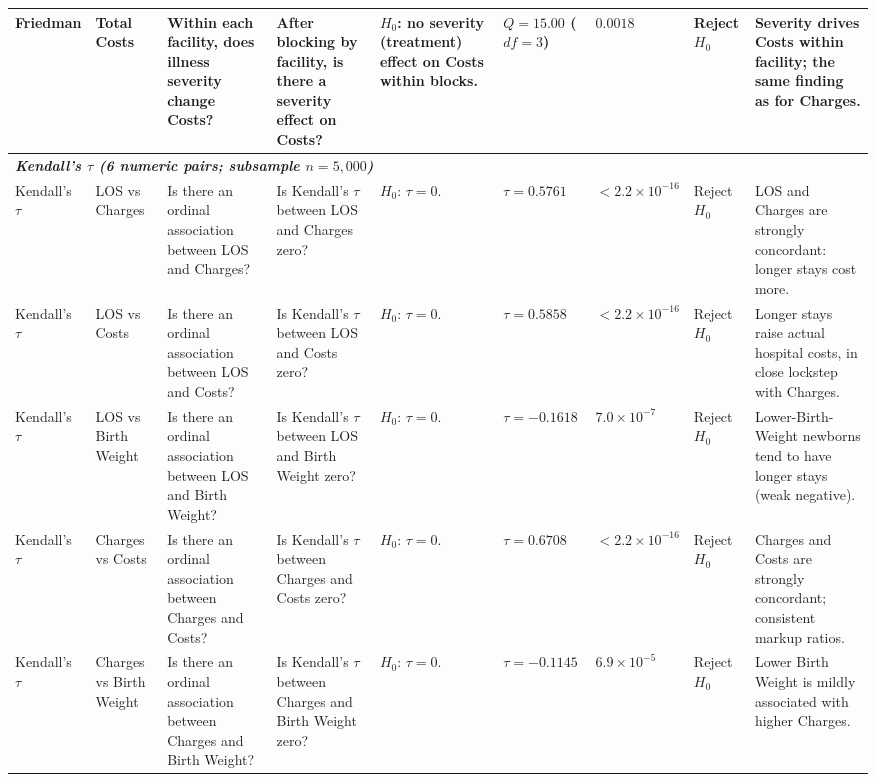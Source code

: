 \documentclass[12pt]{article}
\begin{document}
\begin{landscape}
\begin{scriptsize}
\begin{longtable}{p{2.0cm} p{2.4cm} p{3.0cm} p{2.7cm} p{2.5cm} p{1.7cm} p{1.3cm} p{1.3cm} p{3.0cm}}
Friedman & Total Costs & Within each facility, does illness severity change Costs? & After blocking by facility, is there a severity effect on Costs? & $H_0$: no severity (treatment) effect on Costs within blocks. & $Q = 15.00$ ($df=3$) & $0.0018$ & Reject $H_0$ & Severity drives Costs within facility; the same finding as for Charges. \\

\midrule
\multicolumn{9}{l}{\textit{\textbf{Kendall's $\tau$ (6 numeric pairs; subsample $n=5{,}000$)}}} \\

Kendall's $\tau$ & LOS vs Charges & Is there an ordinal association between LOS and Charges? & Is Kendall's $\tau$ between LOS and Charges zero? & $H_0$: $\tau = 0$. & $\tau = 0.5761$ & $< 2.2 \times 10^{-16}$ & Reject $H_0$ & LOS and Charges are strongly concordant: longer stays cost more. \\

Kendall's $\tau$ & LOS vs Costs & Is there an ordinal association between LOS and Costs? & Is Kendall's $\tau$ between LOS and Costs zero? & $H_0$: $\tau = 0$. & $\tau = 0.5858$ & $< 2.2 \times 10^{-16}$ & Reject $H_0$ & Longer stays raise actual hospital costs, in close lockstep with Charges. \\

Kendall's $\tau$ & LOS vs Birth Weight & Is there an ordinal association between LOS and Birth Weight? & Is Kendall's $\tau$ between LOS and Birth Weight zero? & $H_0$: $\tau = 0$. & $\tau = -0.1618$ & $7.0 \times 10^{-7}$ & Reject $H_0$ & Lower-Birth-Weight newborns tend to have longer stays (weak negative). \\

Kendall's $\tau$ & Charges vs Costs & Is there an ordinal association between Charges and Costs? & Is Kendall's $\tau$ between Charges and Costs zero? & $H_0$: $\tau = 0$. & $\tau = 0.6708$ & $< 2.2 \times 10^{-16}$ & Reject $H_0$ & Charges and Costs are strongly concordant; consistent markup ratios. \\

Kendall's $\tau$ & Charges vs Birth Weight & Is there an ordinal association between Charges and Birth Weight? & Is Kendall's $\tau$ between Charges and Birth Weight zero? & $H_0$: $\tau = 0$. & $\tau = -0.1145$ & $6.9 \times 10^{-5}$ & Reject $H_0$ & Lower Birth Weight is mildly associated with higher Charges. \\


\end{longtable}
\end{scriptsize}
\end{landscape}
\end{document}
